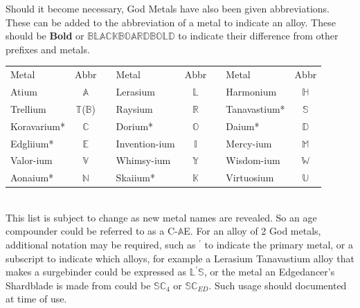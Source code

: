 \documentclass[conference]{IEEEtran}
\newcommand{\n}{\hfill\break}
\begin{document}
Should it become necessary, God Metals have also been given abbreviations.  These can be added to the abbreviation of a metal to indicate an alloy.  These should be \textbf{Bold} or $\mathbb{BLACK BOARD BOLD}$ to indicate their difference from other prefixes and metals.\\\n
\setlength{\tabcolsep}{.5\tabcolsep}
\begin{tabular}{|l |c |c|l |c |c|l |c | }
	
	\cline{1-2}\cline{4-5}\cline{7-8}
	Metal&Abbr&&Metal&Abbr&&Metal&Abbr\\
	\cline{1-2}\cline{4-5}\cline{7-8}
	
	\cline{1-2}\cline{4-5}\cline{7-8}
	Atium & $\mathbb{A}$&&  Lerasium & $\mathbb{L}$ && 	Harmonium & $\mathbb{H}$ \\ 
	\cline{1-2}\cline{4-5}\cline{7-8}
	Trellium & $\mathbb{T}$($\mathbb{B}$) && Raysium &$\mathbb{R}$ &&  	Tanavastium* & $\mathbb{S}$\\
	\cline{1-2}\cline{4-5}\cline{7-8}
	Koravarium* & $\mathbb{C}$ && Dorium*& $\mathbb{O}$ &&  Daium* & $\mathbb{D}$\\
	\cline{1-2}\cline{4-5}\cline{7-8}
	Edgliium* & $\mathbb{E}$ &&	Invention-ium&$\mathbb{I}$  &&Mercy-ium & $\mathbb{M}$  \\
	\cline{1-2}\cline{4-5}\cline{7-8}
	Valor-ium & $\mathbb{V}$&&	Whimsy-ium & $\mathbb{Y}$ && Wisdom-ium &$\mathbb{W}$\\
	\cline{1-2}\cline{4-5}\cline{7-8}
	Aonaium* & $\mathbb{N}$ &&Skaiium* & $\mathbb{K}$ && Virtuosium & $\mathbb{U}$ \\
	\cline{1-2}\cline{4-5}\cline{7-8}
\end{tabular}\\\n
This list is subject to change as new metal names are revealed.  
So an age compounder could be referred to as a C-$\mathbb{A}$E.  For an alloy of 2 God metals, additional notation may be required, such as $^\prime$ to indicate the primary metal, or a subscript to indicate which alloys, for example a Lerasium Tanavastium alloy that makes a surgebinder could be expressed as $\mathbb{L}^\prime\mathbb{S}$, or the metal an Edgedancer's Shardblade is made from could be $\mathbb{SC}_4$ or $\mathbb{SC}_{ED}$.  Such usage should documented at time of use.
\\\n
{}
 
 
 
 
 
 
 
 
 
 
\end{document}
